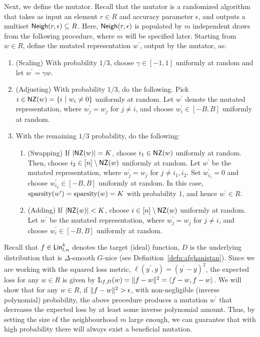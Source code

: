 Next, we define the mutator. Recall that the mutator is a randomized algorithm
that takes as input an element $r \in R$ and accuracy parameter $\epsilon$,
and outputs a multiset $\mathsf{Neigh}(r, \epsilon) \subseteq R$. Here, $\mathsf{Neigh}(r,
\epsilon)$ is populated by $m$ independent draws from the following procedure,
where $m$ will be specified later. Starting from $w \in R$, define the mutated
representation $w^\prime$, output by the mutator, as:
\begin{enumerate}
%
\item (Scaling) With probability $1/3$, choose $\gamma \in [-1, 1]$ uniformly at
random and let $w^\prime = \gamma w$. 
%
\item (Adjusting) With probability $1/3$, do the following.
Pick $i \in \mathsf{NZ}(w) = \{ i~|~ w_i \neq 0 \}$ uniformly at random. Let
$w^\prime$ denote the mutated representation, where $w^\prime_j = w_j$ for $j
\neq i$, and choose $w^\prime_i \in [-B, B]$ uniformly at random.
%
\item With the remaining $1/3$ probability, do the following:
\begin{enumerate}
\item (Swapping) If $|\mathsf{NZ}(w)| = K$, choose $i_1 \in \mathsf{NZ}(w)$ uniformly at random.
Then, choose $i_2 \in [n] \setminus \mathsf{NZ}(w)$ uniformly at random. Let $w^\prime$
be the mutated representation, where $w_j^\prime = w_j$ for $j \neq i_1, i_2$.
Set $w_{i_1}^\prime = 0$ and choose $w_{i_2}^\prime \in [-B, B]$ uniformly at
random. In this case, $\mathrm{sparsity}(w^\prime) = \mathrm{sparsity}(w) = K$
with probability $1$, and hence $w^\prime \in R$.
\item (Adding) If $|\mathsf{NZ}(w)| < K$, choose $i \in [n] \setminus \mathsf{NZ}(w)$ uniformly
at random. Let $w^\prime$ be the mutated representation, where $w_j^\prime =
w_j$ for $j \neq i$, and choose $w^\prime_i \in [-B, B]$ uniformly at random.
\end{enumerate}
\end{enumerate}

Recall that $f \in \mathsf{Lin}^k_{l, u}$ denotes the target (ideal) function, $D$ is
the underlying distribution that is $\Delta$-smooth $G$-nice (see
Definition~\ref{defn:afghanistan}). Since we are working with the squared loss
metric, $\ell(y^\prime, y) = (y^\prime - y)^2$, the expected loss for any $w \in
R$ is given by $\mathrm{L}_{f, D}(w) = \Vert f - w \Vert^2 = \langle f - w, f - w \rangle$.  We
will show that for any $w \in R$, if $\Vert f - w \Vert^2 > \epsilon$, with
non-negligible (inverse polynomial) probability, the above procedure produces a
mutation $w^\prime$ that decreases the expected loss by at least some inverse
polynomial amount. Thus, by setting the size of the neighbourhood $m$ large
enough, we can guarantee that with high probability there will always exist a
beneficial mutation.
%

